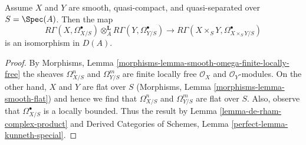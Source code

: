 \begin{lemma}
\label{lemma-kunneth-de-rham}
Assume $X$ and $Y$ are smooth, quasi-compact, and quasi-separated over
$S = \Spec(A)$. Then the map
$$
R\Gamma(X, \Omega^\bullet_{X/S})
\otimes_A^\mathbf{L}
R\Gamma(Y, \Omega^\bullet_{Y/S})
\longrightarrow
R\Gamma(X \times_S Y, \Omega^\bullet_{X \times_S Y/S})
$$
is an isomorphism in $D(A)$.
\end{lemma}

\begin{proof}
By Morphisms, Lemma \ref{morphisms-lemma-smooth-omega-finite-locally-free}
the sheaves $\Omega^n_{X/S}$ and $\Omega^m_{Y/S}$ are finite locally free
$\mathcal{O}_X$ and $\mathcal{O}_Y$-modules. On the other hand, $X$ and $Y$
are flat over $S$ (Morphisms, Lemma \ref{morphisms-lemma-smooth-flat})
and hence we find that $\Omega^n_{X/S}$ and $\Omega^m_{Y/S}$ are flat over $S$.
Also, observe that $\Omega^\bullet_{X/S}$ is a locally bounded. Thus
the result by Lemma \ref{lemma-de-rham-complex-product} and
Derived Categories of Schemes, Lemma \ref{perfect-lemma-kunneth-special}.
\end{proof}

